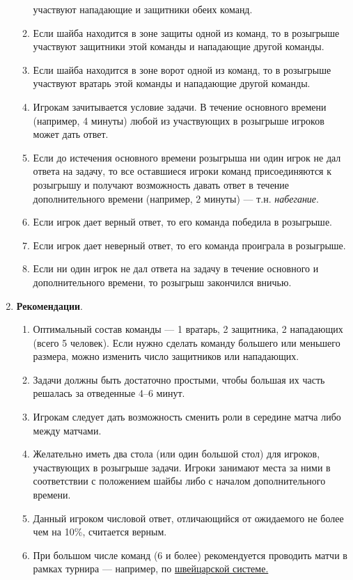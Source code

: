 \documentclass[11pt]{article}
\begin{document}
\begin{enumerate}[label*=\arabic*.]
\begin{enumerate}[label*=\arabic*.]
      участвуют нападающие и защитники обеих команд.
    \item Если шайба находится в зоне защиты одной из команд, то в
      розыгрыше участвуют защитники этой команды и нападающие другой
      команды.
    \item Если шайба находится в зоне ворот одной из команд, то в
      розыгрыше участвуют вратарь этой команды и нападающие другой
      команды.
    \item Игрокам зачитывается условие задачи. В течение основного
      времени (например, 4 минуты) любой из участвующих в розыгрыше
      игроков может дать ответ.
    \item Если до истечения основного времени розыгрыша ни один игрок
      не дал ответа на задачу, то все оставшиеся игроки команд
      присоединяются к розыгрышу и получают возможность давать ответ в
      течение дополнительного времени (например, 2 минуты) ---
      т.н. \textit{набегание}.
    \item Если игрок дает верный ответ, то его команда победила в
      розыгрыше.
    \item Если игрок дает неверный ответ, то его команда проиграла в
      розыгрыше.
    \item Если ни один игрок не дал ответа на задачу в течение
      основного и дополнительного времени, то розыгрыш закончился
      вничью.
    \end{enumerate}
    \clearpage
  \item \textbf{Рекомендации}.
    \begin{enumerate}[label*=\arabic*.]
    \item Оптимальный состав команды --- 1 вратарь, 2 защитника, 2
      нападающих (всего 5 человек). Если нужно сделать команду
      большего или меньшего размера, можно изменить число защитников
      или нападающих.
    \item Задачи должны быть достаточно простыми, чтобы большая их
      часть решалась за отведенные 4--6 минут.
    \item Игрокам следует дать возможность сменить роли в середине
      матча либо между матчами.
    \item Желательно иметь два стола (или один большой стол) для
      игроков, участвующих в розыгрыше задачи. Игроки занимают места
      за ними в соответствии с положением шайбы либо с началом
      дополнительного времени.
    \item Данный игроком числовой ответ, отличающийся от ожидаемого не
      более чем на 10\%, считается верным.
    \item При большом числе команд (6 и более) рекомендуется
      проводить матчи в рамках турнира --- например, по
      \href{http://ru.wikipedia.org/wiki/%D0%A8%D0%B2%D0%B5%D0%B9%D1%86%D0%B0%D1%80%D1%81%D0%BA%D0%B0%D1%8F_%D1%81%D0%B8%D1%81%D1%82%D0%B5%D0%BC%D0%B0}{швейцарской системе.}
    \end{enumerate}
\end{enumerate}
\end{document}
